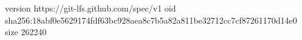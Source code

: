 version https://git-lfs.github.com/spec/v1
oid sha256:18abf0e5629174fdf63bc928aea8c7b5a82a811be32712cc7cf87261170d14e0
size 262240
